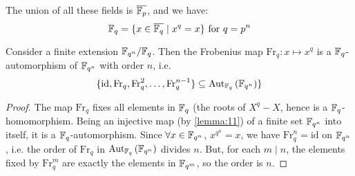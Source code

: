 \begin{figure}[H]
  \centering
\end{figure}
The union of all these fields is $\overline{\finitefield{p}}$, and we have:
\begin{equation*}
  \finitefield{q} = \{ x \in \overline{\finitefield{q}} \mid x^q = x \} \text{ for } q = p^n
\end{equation*}

\begin{lemma}
  \label{lemma:66}
  Consider a finite extension $\finitefield{q^n}/\finitefield{q}$. Then the Frobenius map $\text{Fr}_q : x \mapsto x^q$ is a $\finitefield{q}$-automorphism of $\finitefield{q^n}$ with order $n$, i.e. 
  \begin{equation*}
    \{ \text{id}, \text{Fr}_q, \text{Fr}_q^2, \ldots, \text{Fr}_q^{n-1} \} \subseteq \autset[\finitefield{q}]{\finitefield{q^n}} \}
  \end{equation*}
\end{lemma}

\begin{proof}
  The map $\text{Fr}_q$ fixes all elements in $\finitefield{q}$ (the roots of $X^q-X$, hence is a $\finitefield{q}$-homomorphism. Being an injective map (by \autoref{lemma:11}) of a finite set $\finitefield{q^n}$ into itself, it is a $\finitefield{q}$-automorphism. Since $\forall x \in \finitefield{q^n}$, $x^{q^n}=x$, we have $\text{Fr}_q^n = \text{id}$ on $\finitefield{q^n}$, i.e. the order of $\text{Fr}_q$ in $\autset[\finitefield{q}]{\finitefield{q^n}}$ divides $n$. But, for each $m \mid n$, the elements fixed by $\text{Fr}_q^m$ are exactly the elements in $\finitefield{q^m}$, so the order is $n$.
\end{proof}

